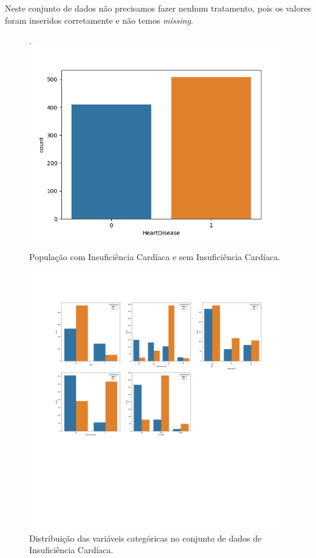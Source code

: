 Neste conjunto de dados não precisamos fazer nenhum tratamento, pois os valores foram inseridos corretamente e não temos \textit{missing}.
\begin{figure}[H]
 \caption{População com Insuficiência Cardíaca e sem Insuficiência Cardíaca.}.
 \label{fig:pop:targ:card}
 \centering
 \includegraphics[scale=0.3]{images/heart_tot.png}
\end{figure}


\begin{figure}[H]
 \caption{Distribuição das variáveis categóricas no conjunto de dados de Insuficiência Cardíaca.}
 \label{fig:var:cat:1:card}
 \centering
\includegraphics[scale=0.25]{images/heart_cat.png}
\end{figure}


